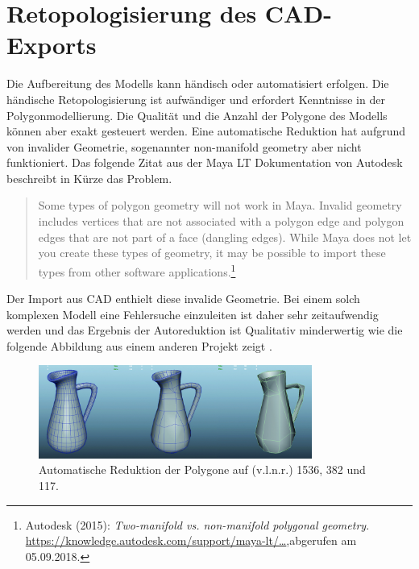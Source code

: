 \label{sec:RetopologisierungDesCAD-Exports}
\section{Retopologisierung des CAD-Exports}
Die Aufbereitung des Modells kann händisch oder automatisiert erfolgen. Die händische Retopologisierung ist aufwändiger und erfordert Kenntnisse in der Polygonmodellierung. Die Qualität und die Anzahl der Polygone des Modells können aber exakt gesteuert werden. Eine automatische Reduktion hat aufgrund von invalider Geometrie, sogenannter non-manifold geometry aber nicht funktioniert. Das folgende Zitat aus der Maya LT Dokumentation von Autodesk beschreibt in Kürze das Problem. 

\begin{quote}
\glqq Some types of polygon geometry will not work in Maya. Invalid geometry includes vertices that are not associated with a polygon edge and polygon edges that are not part of a face (dangling edges). While Maya does not let you create these types of geometry, it may be possible to import these types from other software applications.\grqq\footnote{Autodesk  (2015): \textit{Two-manifold vs. non-manifold polygonal geometry}.\newline
\href{https://knowledge.autodesk.com/support/maya-lt/learn-explore/caas/CloudHelp/cloudhelp/2015/ENU/MayaLT/files/Polygons-overview-Twomanifold-vs--nonmanifold-polygonal-geometry-htm.html}{https://knowledge.autodesk.com/support/maya-lt/\dots},\newline abgerufen am 05.09.2018.} 
\end{quote}

Der Import aus CAD enthielt diese invalide Geometrie. Bei einem solch komplexen Modell eine Fehlersuche einzuleiten ist daher sehr zeitaufwendig werden und das Ergebnis der Autoreduktion ist Qualitativ minderwertig wie die folgende Abbildung aus einem anderen Projekt zeigt . 

\begin{figure}[H]
	\centering
	\captionsetup{width=0.8\textwidth}
	\includegraphics[keepaspectratio, width=0.8\textwidth]{bildquellen/hp-zu-lp-automatisch}
	\caption{Automatische Reduktion der Polygone auf (v.l.n.r.) 1536, 382 und 117.}
	\label{fig:2.4}
\end{figure}


